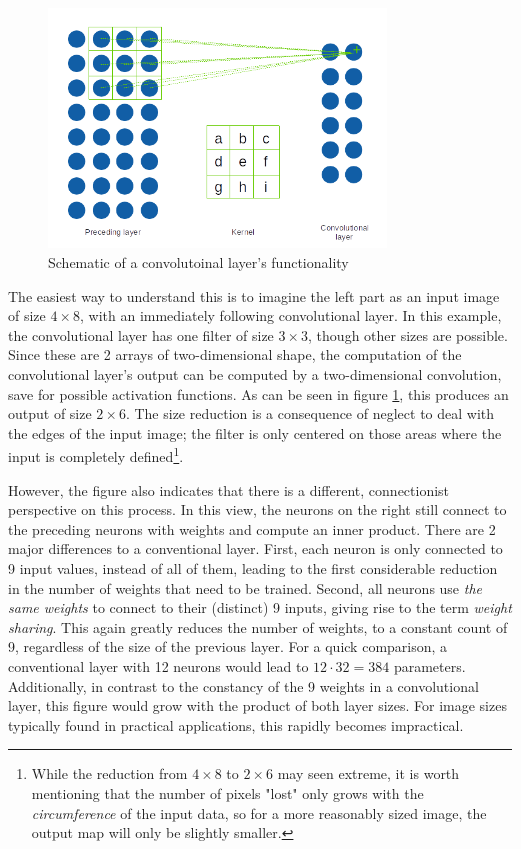 \documentclass[11pt, a4paper]{article}
\begin{document}
\begin{figure}[htp]
	\centering
	\includegraphics[width=0.8\textwidth]{images/convolution_layer.png}
	\caption{Schematic of a convolutoinal layer's functionality}
	\label{fig:convolutional-layer}
\end{figure}

The easiest way to understand this is to imagine the left part as an input image of size $4 \times 8$, with an immediately following convolutional layer. In this example, the convolutional layer has one filter of size $3 \times 3$, though other sizes are possible. Since these are 2 arrays of two-dimensional shape, the computation of the convolutional layer's output can be computed by a two-dimensional convolution, save for possible activation functions. As can be seen in figure \ref{fig:convolutional-layer}, this produces an output of size $2 \times 6$. The size reduction is a consequence of neglect to deal with the edges of the input image; the filter is only centered on those areas where the input is completely defined\footnote{While the reduction from $4 \times 8$ to $2 \times 6$ may seen extreme, it is worth mentioning that the number of pixels "lost" only grows with the \emph{circumference} of the input data, so for a more reasonably sized image, the output map will only be slightly smaller.}.

However, the figure also indicates that there is a different, connectionist perspective on this process. In this view, the neurons on the right still connect to the preceding neurons with weights and compute an inner product. There are 2 major differences to a conventional layer. First, each neuron is only connected to 9 input values, instead of all of them, leading to the first considerable reduction in the number of weights that need to be trained. Second, all neurons use \emph{the same weights} to connect to their (distinct) 9 inputs, giving rise to the term \emph{weight sharing}. This again greatly reduces the number of weights, to a constant count of 9, regardless of the size of the previous layer. For a quick comparison, a conventional layer with 12 neurons would lead to $12 \cdot 32 = 384$ parameters. Additionally, in contrast to the constancy of the 9 weights in a convolutional layer, this figure would grow with the product of both layer sizes. For image sizes typically found in practical applications, this rapidly becomes impractical.
\end{document}

